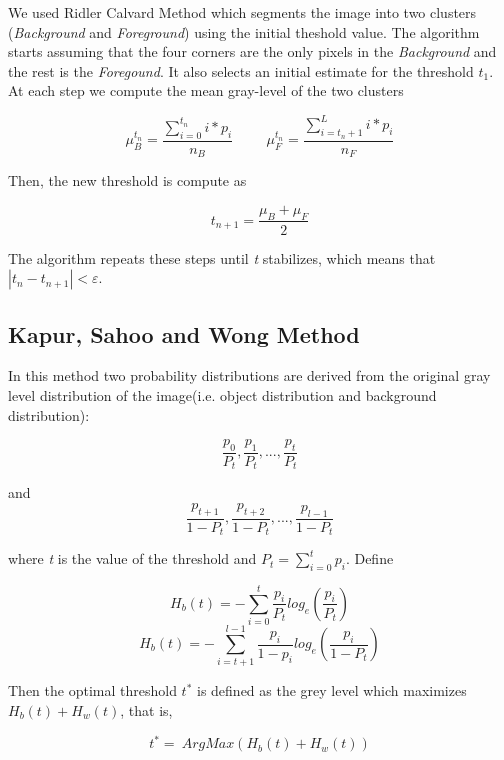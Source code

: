 \documentclass[12]{article}
\begin{document}
We used Ridler Calvard Method which segments the image into two clusters (\textit{Background} and \textit{Foreground}) using the initial theshold value. The algorithm starts assuming that the four corners are the only pixels in the \textit{Background} and the rest is the \textit{Foregound}. It also selects an initial estimate for the threshold \textit{$t_1$}. At each step we compute the mean gray-level of the two clusters
\vspace{-0.5cm}
\begin{center}
$$ \mu_{B}^{t_n} = \frac{\sum_{i = 0}^{t_n} i * p_i}{n_B} \hspace{1cm} \mu_{F}^{t_n} = \frac{\sum_{i = t_n + 1}^{L} i * p_i}{n_F} $$
\end{center}
Then, the new threshold is compute as
\vspace{-0.5cm}
\begin{center}
$$ t_{n + 1} = \frac{\mu_{B} + \mu_{F}}{2} $$
\end{center}
The algorithm repeats these steps until \textit{t} stabilizes, which means that $|t_n - t_{n + 1}| < \varepsilon $.

\subsection{Kapur, Sahoo and Wong Method}
In this method two probability distributions are derived from the original gray level distribution of the image(i.e. object distribution and background distribution): 
\vspace{-0.5cm}
\begin{center}
$$\frac{p_0}{P_t},\frac{p_1}{P_t},...,\frac{p_t}{P_t}$$
\end{center} \begin{center}
and
$$\frac{p_{t+1}}{1-P_t},\frac{p_{t+2}}{1-P_t},...,\frac{p_{l-1}}{1-P_t}$$
\end{center}
\vspace{0.4cm}

where \textit{t} is the value of the threshold and $P_t = \sum_{i=0}^{t}{p_i}$. Define

$$H_b(t) = - \sum_{i = 0}^{t} \frac{p_i}{P_t}log_e\left(\frac{p_i}{P_t}\right)$$
$$ H_b(t) = - \sum_{i = t+1}^{l-1} \frac{p_i}{1-p_i}log_e\left(\frac{p_i}{1-P_t}\right)$$

Then the optimal threshold $t^{*}$ is defined as the grey level which maximizes $H_b(t)+H_w(t)$, that is, 
\vspace{-0.5cm}
\begin{center}
$$t^{*}=\ ArgMax\left(H_b(t) + H_w(t)\right)$$
\end{center}
\end{document}
